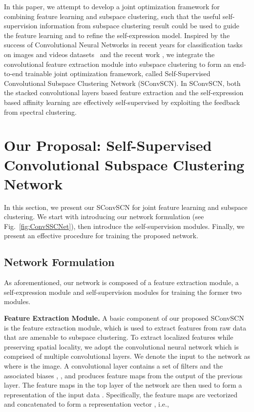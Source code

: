 \documentclass[10pt,twocolumn,letterpaper]{article}
\newcommand{\myparagraph}[1]{\smallskip\noindent\textbf{#1.}}
\begin{document}
In this paper, we attempt to develop a joint optimization framework for combining feature learning and subspace clustering, such that the useful self-supervision information from subspace clustering result could be used to guide the feature learning and to refine the self-expression model. Inspired by the success of Convolutional Neural Networks in recent years for classification tasks on images and videos datasets~\cite{Krizhevsky:NIPS2012} and the recent work \cite{Ji:NIPS17}, we integrate the convolutional feature extraction module into subspace clustering to form an end-to-end trainable joint optimization framework, called Self-Supervised Convolutional Subspace Clustering Network (SConvSCN). In SConvSCN, both the stacked convolutional layers based feature extraction and the self-expression based affinity learning are effectively self-supervised by exploiting the feedback from spectral clustering.



\section{Our Proposal: Self-Supervised Convolutional Subspace Clustering Network} \label{sec:ConvSSCNet}

In this section, we present our SConvSCN for joint feature learning and subspace clustering.
We start with introducing our network formulation (see Fig.~\ref{fig:ConvSSCNet}), then introduce the self-supervision modules.
Finally, we present an effective procedure for training the proposed network.


\subsection{Network Formulation}

As aforementioned, our network is composed of a feature extraction module, a self-expression module and self-supervision modules for training the former two modules.

\myparagraph{Feature Extraction Module} A basic component of our proposed SConvSCN is the feature extraction module, which is used to extract features from raw data that are amenable to subspace clustering.
To extract localized features while preserving spatial locality, we adopt the convolutional neural network which is comprised of multiple convolutional layers.
We denote the input to the network as  where  is the image.
A convolutional layer  contains a set of filters  and the associated biases , , and produces  feature maps from the output of the previous layer. The feature maps  in the top layer  of the network are then used to form a representation of the input data . Specifically, the  feature maps  are vectorized and concatenated to form a representation vector , i.e.,
\end{document}
